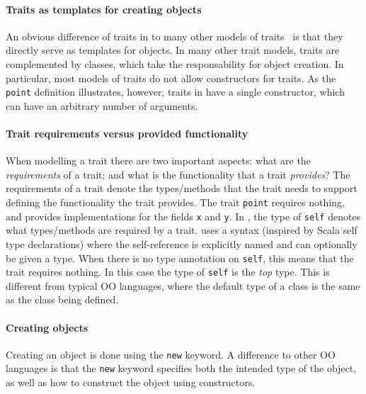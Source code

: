 \paragraph{Traits as templates for creating objects} An obvious difference of
traits in \name to many other models of
traits~\cite{scharli2003traits,fisher2004typed,odersky2005scalable} is that they
directly serve as templates for objects. In many other trait models, traits are
complemented by classes, which take the responsability for object creation. In
particular, most models of traits do not allow constructors for traits. As the
\lstinline{point} definition illustrates, however, traits in \name have a single
constructor, which can have an arbitrary number of arguments.

\paragraph{Trait requirements versus provided functionality}
When modelling a trait there are two important aspects: what are the
\emph{requirements} of a trait; and what is the functionality that a trait
\emph{provides}? The requirements of a trait denote the types/methods that the
trait needs to support defining the functionality the trait provides. The trait
\lstinline{point} requires nothing, and provides implementations for the fields
\lstinline{x} and \lstinline{y}. In \name, the type of \lstinline$self$ denotes
what types/methods are required by a trait. \name uses a syntax (inspired by
Scala self type declarations) where the self-reference is explicitly named and
can optionally be given a type. When there is no type annotation on
\lstinline{self}, this means that the trait requires nothing. In this case the
type of \lstinline{self} is the \emph{top} type. This is different from typical
OO languages, where the default type of a class is the same as the class being
defined.


\paragraph{Creating objects}
Creating an object is done using the \lstinline{new} keyword. A difference to
other OO languages is that the \lstinline{new} keyword specifies both the
intended type of the object, as well as how to construct the object using
constructors.

